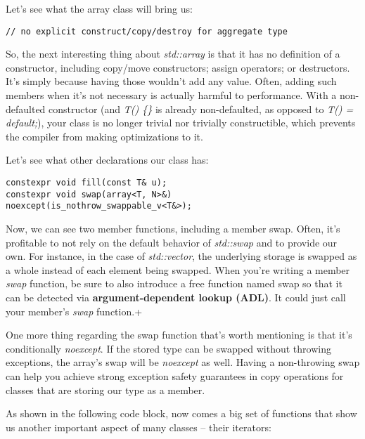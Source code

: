 Let's see what the array class will bring us:


\begin{lstlisting}[style=styleCXX]
// no explicit construct/copy/destroy for aggregate type
\end{lstlisting}

So, the next interesting thing about \textit{std::array} is that it has no definition of a constructor, including copy/move constructors; assign operators; or destructors. It's simply because having those wouldn't add any value. Often, adding such members when it's not necessary is actually harmful to performance. With a non-defaulted constructor (and \textit{T() \{\} }is already non-defaulted, as opposed to \textit{T() = default;}), your class is no longer trivial nor trivially constructible, which prevents the compiler from making optimizations to it.

Let's see what other declarations our class has:

\begin{lstlisting}[style=styleCXX]
constexpr void fill(const T& u);
constexpr void swap(array<T, N>&) noexcept(is_nothrow_swappable_v<T&>);

\end{lstlisting}

Now, we can see two member functions, including a member swap. Often, it's profitable to not rely on the default behavior of \textit{std::swap} and to provide our own. For instance, in the case of \textit{std::vector}, the underlying storage is swapped as a whole instead of each element being swapped. When you're writing a member \textit{swap} function, be sure to also introduce a free function named swap so that it can be detected via \textbf{argument-dependent lookup (ADL)}. It could just call your member's \textit{swap} function.+

One more thing regarding the swap function that's worth mentioning is that it's  conditionally \textit{noexcept}. If the stored type can be swapped without throwing exceptions, the array's swap will be \textit{noexcept} as well. Having a non-throwing swap can help you achieve strong exception safety guarantees in copy operations for classes that are storing our type as a member.

As shown in the following code block, now comes a big set of functions that show us another important aspect of many classes – their iterators:


